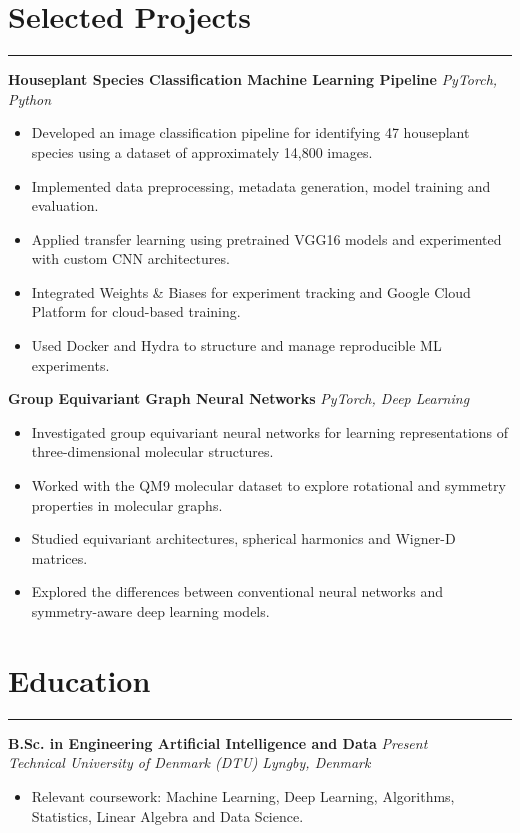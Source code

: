 \documentclass[letterpaper, 10pt]{article}
\begin{document}
\section*{Selected Projects}
\hrule
\vspace{4pt}

\textbf{Houseplant Species Classification Machine Learning Pipeline}
\hfill \textit{PyTorch, Python}
\begin{itemize}
    \item Developed an image classification pipeline for
    identifying 47 houseplant species using a dataset of
    approximately 14,800 images.
    \item Implemented data preprocessing, metadata generation,
    model training and evaluation.
    \item Applied transfer learning using pretrained VGG16 models and experimented with custom CNN architectures.
    \item Integrated Weights \& Biases for experiment tracking and Google Cloud Platform for cloud-based training.
    \item Used Docker and Hydra to structure and manage
    reproducible ML experiments.
\end{itemize}

\vspace{4pt}

\textbf{Group Equivariant Graph Neural Networks}
\hfill \textit{PyTorch, Deep Learning}
\begin{itemize}
    \item Investigated group equivariant neural networks
    for learning representations of three-dimensional
    molecular structures.
    \item Worked with the QM9 molecular dataset to explore rotational and symmetry properties in molecular graphs.
    \item Studied equivariant architectures, spherical
    harmonics and Wigner-D matrices.
    \item Explored the differences between conventional
    neural networks and symmetry-aware deep learning models.
\end{itemize}

\section*{Education}
\hrule
\vspace{4pt}

\textbf{B.Sc. in Engineering Artificial Intelligence and Data}
\hfill \textit{Present} \\
\textit{Technical University of Denmark (DTU)}
\hfill \textit{Lyngby, Denmark}
\begin{itemize}
    \item Relevant coursework: Machine Learning, Deep Learning,
    Algorithms, Statistics, Linear Algebra and Data Science.
\end{itemize}
\end{document}
